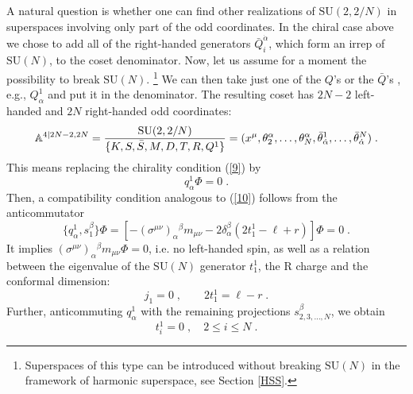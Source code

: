 \documentclass[a4paper,12pt]{article}
\begin{document}
A natural question is whether one can find other realizations of 
$\mbox{SU}(2,2/N)$ in superspaces involving only part of the odd 
coordinates. In the chiral case above we chose to add all of the 
right-handed generators $\bar Q^{\dot\alpha}_i$, which form an 
irrep of $\mbox{SU}(N)$, to the coset denominator. Now, let us 
assume for a moment the possibility to break $\mbox{SU}(N)$. 
\footnote{Superspaces of this type can be introduced without 
breaking $\mbox{SU}(N)$ in the framework of harmonic superspace, 
see Section \ref{HSS}.} We can then take just one of the $Q$'s or 
the $\bar Q$'s , e.g., $Q^1_\alpha$ and put it in the denominator. 
The resulting coset has $2N-2$ left-handed and $2N$ right-handed 
odd coordinates: 
\begin{equation}
{\mathbb A}^{4\vert 2N-2,2N} = {\mbox{SU}(2,2/N)\over \{K,S,\bar 
S,M,D,T,R,Q^1\}} = 
(x^\mu,\theta^{\alpha}_2,\ldots,\theta^{\alpha}_N,\bar\theta^1_{\dot\alpha}, 
\ldots, \bar\theta^N_{\dot\alpha}) \;. \label{17} 
\end{equation} 
This means replacing the chirality condition (\ref{9}) by 
\begin{equation}\label{18}
  q^1_\alpha\Phi=0\;.
\end{equation}
Then, a compatibility condition analogous to (\ref{10}) follows 
from the anticommutator 
\begin{equation}\label{19}
 \{q^1_\alpha, s^\beta_1\}\Phi = \left[-(\sigma^{\mu\nu})_\alpha{}^\beta 
m_{\mu\nu} - 2\delta^\beta_\alpha\left(2t^1_1 -\ell +r 
\right)\right]\Phi = 0\;. 
\end{equation}
It implies $(\sigma^{\mu\nu})_\alpha{}^\beta m_{\mu\nu}\Phi = 0$, 
i.e. no left-handed spin, as well as a relation between the 
eigenvalue of the $\mbox{SU}(N)$ generator $t^1_1$, the R charge 
and the conformal dimension: 
\begin{equation}\label{20}
  j_1=0\;, \qquad 2t^1_1 = \ell-r\;.
\end{equation}
Further, anticommuting $q^1_\alpha$ with the remaining projections  
$s^\beta_{2,3,\ldots,N}$, we obtain
\begin{equation}\label{21}
  t^1_i = 0\;, \quad 2\leq i \leq N\;.
\end{equation}
\end{document}
